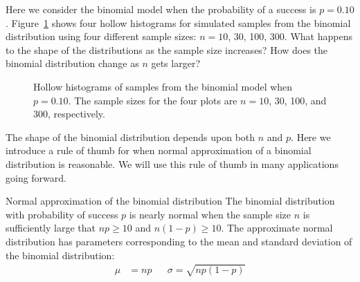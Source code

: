 \begin{exercisewrap}
\begin{nexercise}
Here we consider the binomial model when the probability of a success is $p=0.10$. Figure~\ref{fourBinomialModelsShowingApproxToNormal} shows four hollow histograms for simulated samples from the binomial distribution using four different sample sizes: $n=10$, 30, 100, 300. What happens to the shape of the distributions as the sample size increases?  How does the binomial distribution change as $n$ gets larger?\footnotemark
\end{nexercise}
\end{exercisewrap}

\begin{figure}[h]
\centering
\caption{Hollow histograms of samples from the binomial model when $p=0.10$. The sample sizes for the four plots are $n=10$, 30, 100, and 300, respectively.}
\label{fourBinomialModelsShowingApproxToNormal}
\end{figure}

The shape of the binomial distribution depends upon both $n$ and $p$.     Here we introduce a rule of thumb for when normal approximation of a binomial distribution is reasonable.  We will use this rule of thumb in many applications going forward.  

\begin{onebox}{Normal approximation of the binomial distribution}
The binomial distribution with probability of success $p$ is nearly normal when the sample size $n$ is sufficiently large that $np\ge 10$ and $n(1-p)\ge 10$. The approximate normal distribution has parameters corresponding to the mean and standard deviation of the binomial distribution:\vspace{-1.5mm}
\begin{align*}
\mu &= np
&&\sigma= \sqrt{np(1-p)}
\end{align*}\end{onebox}


